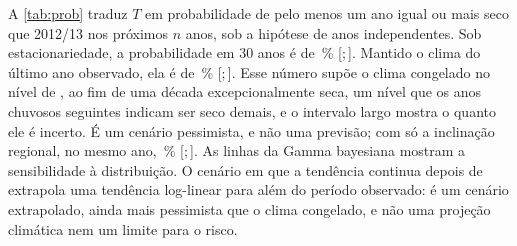 \documentclass[11pt,a4paper]{article}
\newcommand{\IC}[2]{[#1;\,#2]}            %
\begin{document}
A \cref{tab:prob} traduz $T$ em probabilidade de pelo menos um ano igual ou mais seco que
2012/13 nos próximos $n$ anos, sob a hipótese de anos independentes. Sob estacionariedade, a
probabilidade em 30 anos é de \ProbMediaAkaikeNtreszero{}\,\%
\IC{\ProbMediaAkaikeNtreszeroICinf}{\ProbMediaAkaikeNtreszeroICsup}. Mantido o clima do último ano
observado, ela é de \ProbNSMediaUltNtreszero{}\,\%
\IC{\ProbNSMediaUltNtreszeroICinf}{\ProbNSMediaUltNtreszeroICsup}. Esse número supõe o
clima congelado no nível de \UltimoAnoNS{}, ao fim de uma década
excepcionalmente seca, um nível que os anos chuvosos seguintes indicam ser seco demais, e o
intervalo largo mostra o quanto ele é incerto. É um cenário pessimista, e não uma previsão; com só a inclinação regional, no mesmo ano,
\ProbRegMediaNtreszero{}\,\% \IC{\ProbRegMediaNtreszeroICinf}{\ProbRegMediaNtreszeroICsup}. As
linhas da Gamma bayesiana mostram a sensibilidade à distribuição. O cenário em que a tendência
continua depois de \UltimoAnoNS{} extrapola uma tendência log-linear para além do período observado:
é um cenário extrapolado, ainda mais pessimista que o clima congelado, e não uma projeção climática
nem um limite para o risco.
\end{document}
